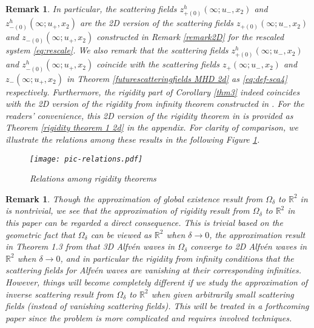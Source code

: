 \documentclass[10pt,reqno]{amsart}
\numberwithin{equation}{section}
\newtheorem{remark}[theorem]{Remark}
\begin{document}
\begin{remark}\label{remark1}
	In particular, the scattering fields 
	$z_{+(0)}^h(\infty;u_-,x_2)$ and $z_{-(0)}^h(\infty;u_+,x_2)$ are the 2D version of the scattering fields $z_{+(0)}(\infty;u_-,x_2)$ and $z_{-(0)}(\infty;u_+,x_2)$ constructed in Remark \ref{remark2D} for the rescaled system \eqref{eq:rescale}. 
	We also remark that the scattering fields  $z_{+(0)}^h(\infty;u_-,x_2)$ and $z_{-(0)}^h(\infty;u_+,x_2)$ coincide with the scattering fields $z_{+}(\infty;u_-,x_2)$ and $z_{-}(\infty;u_+,x_2)$  in Theorem \ref{futurescatteringfields MHD 2d} as \eqref{eq:def-sca4} respectively. Furthermore, the rigidity part of Corollary \ref{thm3} indeed coincides with the 2D version of the rigidity from infinity theorem constructed in \cite{Li-Yu}. For the readers' convenience, this 2D version of the rigidity theorem in \cite{Li-Yu} is provided as Theorem \ref{rigidity theorem 1 2d} in the appendix. For clarity of comparison,  
	we illustrate the relations among these results in the following Figure \ref{fig:relations}.
	\begin{figure}[ht]
		\vspace{-0.1cm}
		\centering
		\texttt{[image: pic-relations.pdf]}
		\vspace{-0.1cm}
		\caption{Relations among rigidity theorems}
		\label{fig:relations}
		\vspace{-0.1cm}
	\end{figure}
\end{remark}

\begin{remark}
	Though the  approximation of global existence result from $\Omega_{\delta}$ to $\mathbb{R}^2$  in \cite{Xu} is nontrivial, 	we see that the  approximation of rigidity result from $\Omega_{\delta}$ to $\mathbb{R}^2$ in this paper  can be regarded a direct consequence.  
	This is trivial based on  the geometric  fact that $\Omega_{\delta}$ can be viewed as $\mathbb{R}^2$ when $\delta\to 0$,    the 
	approximation result in Theorem 1.3 from \cite{Xu} that  3D Alfv\'en waves in $\Omega_{\delta}$ converge to  2D Alfv\'en waves in $\mathbb{R}^2$ 
	when $\delta\to 0$, and in particular 
	the rigidity from infinity  conditions that the scattering fields for Alfv\'en waves 
	are vanishing at their corresponding infinities. However, 
	things will become completely different if we study the  approximation of  inverse scattering result from $\Omega_{\delta}$ to $\mathbb{R}^2$ when given arbitrarily small scattering fields (instead of vanishing scattering fields).     This will be treated in a forthcoming paper since the problem is more complicated and requires involved techniques. 
\end{remark}
\end{document}
